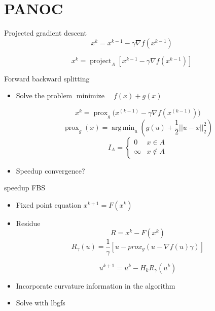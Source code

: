 \documentclass[11pt,t]{beamer}
\DeclareMathOperator{\project}{project}
\DeclareMathOperator{\prox}{prox}
\DeclareMathOperator*{\minimize}{minimize}
\DeclareMathOperator*{\argmin}{arg\,min}
\begin{document}
\section{PANOC}
\begin{frame}{Projected gradient descent}
\begin{equation}
x^k = x^{k-1} - \gamma \nabla f(x^{k-1})
\label{eq:grad descent}
\end{equation}

\begin{equation}
x^k = \project_{A}[ x^{k-1} - \gamma \nabla f(x^{k-1})]
\label{eq:projected grad descent}
\end{equation}

\end{frame}
\begin{frame}{Forward backward splitting}
	
	\begin{itemize}
		\item Solve the problem $ \minimize\quad f(x) + g(x)$
		
		\begin{equation}
		x^k = \prox_{g}\big( x^{(k-1)}- \gamma \nabla f(x^{(k-1)})\big)
		\label{eq:prox grad method}
		\end{equation}
		\begin{equation}
		\prox_g(x)=\argmin_u(g(u) + \frac{1}{2}||u-x||^2_2)
		\end{equation}
		\begin{equation}
		I_A = 
		\begin{cases}
		0 & x \in A  \\
		\infty & x \notin A
		\end{cases}
		\label{eq:indicator function}
		\end{equation}
		\item Speedup convergence?
	\end{itemize}	
\end{frame}

\begin{frame}{speedup FBS}
	\begin{itemize}
		\item Fixed point equation $x^{k+1}=F(x^k)$
		\item Residue
			\begin{equation}
				R = x^k - F(x^k)
			\end{equation}
			\begin{equation}
			R_{\gamma}(u)= \frac{1}{\gamma}\left[ u - prox_g( u - \nabla f(u)\gamma) \right]
			\label{eq:residue prox grad method}
			\end{equation}
			
			\begin{equation}
			u^{k+1} = u^k -H_kR_{\gamma}(u^k)
			\label{eq:newton iteration FBS}
			\end{equation}
		\item Incorporate curvature information in the algorithm
		\item Solve with lbgfs
	\end{itemize}
\end{frame}
\end{document}
